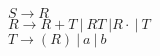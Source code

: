 \begin{center}
    $S \rightarrow R$ \\
    $R \rightarrow R + T \ | \ R T \ | R \cdot \ | \ T$ \\
    $T \rightarrow (R) \ | \ a \ | \ b$ 
\end{center}
